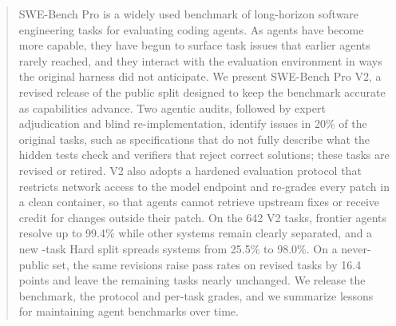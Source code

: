 \begin{abstract}
SWE-Bench Pro is a widely used benchmark of long-horizon software engineering tasks for evaluating coding agents. As agents have become more capable, they have begun to surface task issues that earlier agents rarely reached, and they interact with the evaluation environment in ways the original harness did not anticipate. We present SWE-Bench Pro V2, a revised release of the public split designed to keep the benchmark accurate as capabilities advance. Two agentic audits, followed by expert adjudication and blind re-implementation, identify issues in 20\% of the original tasks, such as specifications that do not fully describe what the hidden tests check and verifiers that reject correct solutions; these tasks are revised or retired. V2 also adopts a hardened evaluation protocol that restricts network access to the model endpoint and re-grades every patch in a clean container, so that agents cannot retrieve upstream fixes or receive credit for changes outside their patch. On the 642 V2 tasks, frontier agents resolve up to 99.4\% while other systems remain clearly separated, and a new \nHard{}-task Hard split spreads systems from 25.5\% to 98.0\%. On a never-public set, the same revisions raise pass rates on revised tasks by 16.4 points and leave the remaining tasks nearly unchanged. We release the benchmark, the protocol and per-task grades, and we summarize lessons for maintaining agent benchmarks over time.
\end{abstract}
